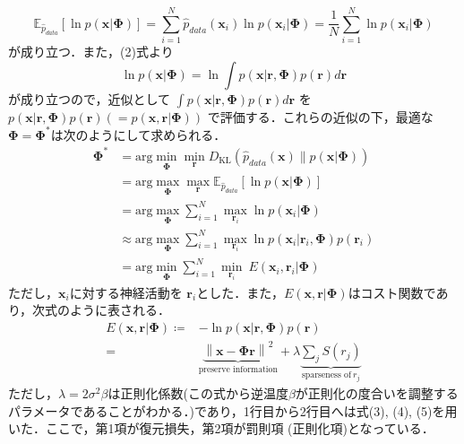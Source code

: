 \begin{equation}
\mathbb{E}_{\hat{p}_{data}} \left[\ln p(\mathbf{x}|\mathbf{\Phi})\right]=\sum_{i=1}^N \hat{p}_{data}(\mathbf{x}_i)\ln p(\mathbf{x}_i|\mathbf{\Phi})=\frac{1}{N}\sum_{i=1}^N \ln p(\mathbf{x}_i|\mathbf{\Phi})
\end{equation}
が成り立つ．また，(2)式より
\begin{equation}
\ln p(\mathbf{x}|\mathbf{\Phi})=\ln \int p(\mathbf{x}|\mathbf{r}, \mathbf{\Phi})p(\mathbf{r})d\mathbf{r}
\end{equation}
が成り立つので，近似として $\displaystyle \int p(\mathbf{x}|\mathbf{r}, \mathbf{\Phi})p(\mathbf{r})d\mathbf{r}$ を $p(\mathbf{x}|\mathbf{r}, \mathbf{\Phi})p(\mathbf{r}) \left(=p(\mathbf{x}, \mathbf{r}| \mathbf{\Phi})\right)$ で評価する．これらの近似の下，最適な$\mathbf{\Phi}=\mathbf{\Phi}^*$は次のようにして求められる．
\begin{align}
\mathbf{\Phi}^*&=\text{arg} \min_{\mathbf{\Phi}} \min_{\mathbf{r}} D_{\text{KL}}\left(\hat{p}_{data}(\mathbf{x}) \| p(\mathbf{x}|\mathbf{\Phi})\right)\\
&=\text{arg} \max_{\mathbf{\Phi}} \max_{\mathbf{r}} \mathbb{E}_{\hat{p}_{data}} \left[\ln p(\mathbf{x}|\mathbf{\Phi})\right]\\
&= \text{arg} \max_{\mathbf{\Phi}}\sum_{i=1}^N \max_{\mathbf{r}_i} \ln p(\mathbf{x}_i|\mathbf{\Phi})\\
&\approx \text{arg} \max_{\mathbf{\Phi}}\sum_{i=1}^N \max_{\mathbf{r}_i} \ln p(\mathbf{x}_i|\mathbf{r}_i, \mathbf{\Phi})p(\mathbf{r}_i)\\
&=\text{arg}\min_{\mathbf{\Phi}} \sum_{i=1}^N \min_{\mathbf{r}_i}\ E(\mathbf{x}_i, \mathbf{r}_i|\mathbf{\Phi})
\end{align}
ただし，$\mathbf{x}_i$に対する神経活動を $\mathbf{r}_i$とした．また，$E(\mathbf{x}, \mathbf{r}|\mathbf{\Phi})$はコスト関数であり，次式のように表される．
\begin{align}
E(\mathbf{x}, \mathbf{r}|\mathbf{\Phi})\coloneqq &-\ln p(\mathbf{x}|\mathbf{r}, \mathbf{\Phi})p(\mathbf{r})\\
=&\underbrace{\left\|\mathbf{x}-\mathbf{\Phi} \mathbf{r}\right\|^2}_{\text{preserve information}} + \lambda \underbrace{\sum_j S\left(r_j\right)}_{\text{sparseness of}\ r_j}
\end{align}
ただし，$\lambda=2\sigma^2\beta$は正則化係数(この式から逆温度$\beta$が正則化の度合いを調整するパラメータであることがわかる．)であり，1行目から2行目へは式(3), (4), (5)を用いた．ここで，第1項が復元損失，第2項が罰則項 (正則化項)となっている．
